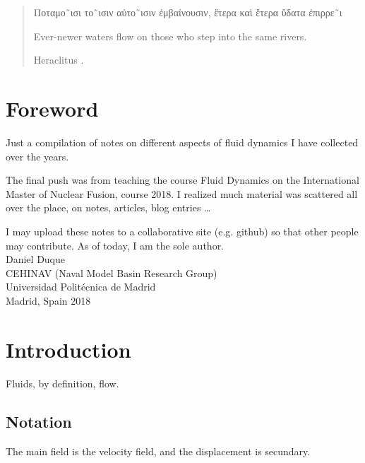 \chapter*{}

\vspace{6ex}
\begin{quote}
  \greektext

  Ποταμο˜ισι το˜ισιν αὐτο˜ισιν ἐμβαίνουσιν, ἕτερα καὶ ἕτερα ὕδατα ἐπιρρε˜ι  \\%
  \latintext
  \begin{em}
    Ever-newer waters flow on those who step into the same rivers.  \\%
  \end{em}
  Heraclitus \cite{Diels-Kranz}.%
\end{quote}


\newpage

\chapter*{Foreword}


Just a compilation of notes on different aspects of fluid
dynamics I have collected over the years.

The final push was from teaching the course Fluid Dynamics on the
International Master of Nuclear Fusion, course 2018. I realized much
material was scattered all over the place, on notes, articles, blog
entries \ldots

I may upload these notes to a collaborative site (e.g. github) so that
other people may contribute. As of today, I am the sole author.\\[4cm]

Daniel Duque \\
CEHINAV (Naval Model Basin Research Group) \\
Universidad Polit\'ecnica de Madrid \\
Madrid, Spain 2018


\chapter{Introduction}

Fluids, by definition, flow.


\section{Notation}

The main field is the velocity field, and the displacement is
secundary.